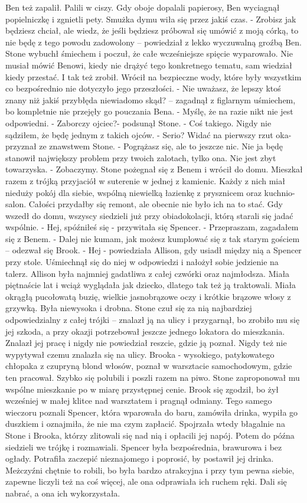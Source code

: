 \documentclass[12pt,a4paper]{book}
\begin{document}
Ben też zapalił. Palili w ciszy. Gdy oboje dopalali papierosy, Ben wyciagnął popielniczkę i zgnietli pety. Smużka dymu wiła się przez jakiś czas. 
- Zrobisz jak będziesz chciał, ale wiedz, że jeśli będziesz próbował się umówić z moją córką, to nie będę z tego powodu zadowolony – powiedział z lekko wyczuwalną groźbą Ben. 
Stone wybuchł śmiechem i poczuł, że całe wcześniejsze spięcie wyparowało. Nie musiał mówić Benowi, kiedy nie drążyć tego konkretnego tematu, sam wiedział kiedy przestać. I tak też zrobił. Wrócił na bezpieczne wody, które były wszystkim co bezpośrednio nie dotyczyło jego przeszłości. 
- Nie uważasz, że lepszy ktoś znany niż jakiś przybłęda niewiadomo skąd? – zagadnął z figlarnym uśmiechem, bo kompletnie nie przejęły go pouczania Bena. 
- Myślę, że na razie nikt nie jest odpowiedni. 
- Zaborczy ojciec?- podsunął Stone.
- Coś takiego. Nigdy nie sądziłem, że będę jednym z takich ojców.
- Serio? Widać na pierwszy rzut oka- przyznał ze znawstwem Stone. 
- Pogrążasz się, ale to jeszcze nic. Nie ja będę stanowił największy problem przy twoich zalotach, tylko ona. Nie jest zbyt towarzyska. 
- Zobaczymy. 
Stone pożegnał się z Benem i wrócił do domu. Mieszkał razem z trójką przyjaciół w suterenie w jednej z kamienic. Każdy z nich miał nieduży pokój dla siebie, wspólną niewielką łazienkę z prysznicem oraz kuchnio-salon. Całości przydałby się remont, ale obecnie nie było ich na to stać. 
Gdy wszedł do domu, wszyscy siedzieli już przy obiadokolacji, którą starali się jadać wspólnie. 
- Hej, spóźniłeś się - przywitała się Spencer. 
- Przepraszam, zagadałem się z Benem. 
- Dalej nie kumam, jak możesz kumplować się z tak starym gościem – odezwał się Brook. 
- Hej - powiedziała Allison, gdy usiadł między nią a Spencer przy stole. 
Uśmiechnął się do niej w odpowiedzi i nałożył sobie jedzienie na talerz. Allison była najmniej gadatliwa z całej czwórki oraz najmłodsza. Miała piętnaście lat i wciąż wyglądała jak dziecko, dlatego tak też ją traktowali. Miała okrągłą pucołowatą buzię, wielkie jasnobrązowe oczy i krótkie brązowe włosy z grzywką. Była niewysoka i drobna. Stone czuł się za nią najbardziej odpowiedzialny z całej trójki – znalazł ją na ulicy i przygarnął, bo zrobiło mu się jej szkoda, a przy okazji potrzebował jeszcze jednego lokatora do mieszkania. Znalazł jej pracę i nigdy nie powiedział reszcie, gdzie ją poznał. Nigdy też nie wypytywał czemu znalazła się na ulicy. 
Brooka - wysokiego, patykowatego chłopaka z czupryną blond włosów, poznał w warsztacie samochodowym, gdzie ten pracował. Szybko się polubili i poszli razem na piwo. Stone zaproponował mu wspólne mieszkanie po w miarę przystępnej cenie. Brook się zgodził, bo żył wcześniej w małej klitce nad warsztatem i pragnął odmiany. Tego samego wieczoru poznali Spencer, która wparowała do baru, zamówiła drinka, wypiła go duszkiem i oznajmiła, że nie ma czym zapłacić. Spojrzała wtedy błagalnie na Stone i Brooka, którzy zlitowali się nad nią i opłacili jej napój. Potem do późna siedzieli we trójkę i rozmawiali. Spencer była bezpośrednia, brawurowa i bez ogłady. Potrafiła zaczepić nieznajomego i poprosić, by postawił jej drinka. Meżczyźni chętnie to robili, bo była bardzo atrakcyjna i przy tym pewna siebie, zapewne liczyli też na coś więcej, ale ona odprawiała ich ruchem ręki. Dali się nabrać, a ona ich wykorzystała. 
\end{document}
